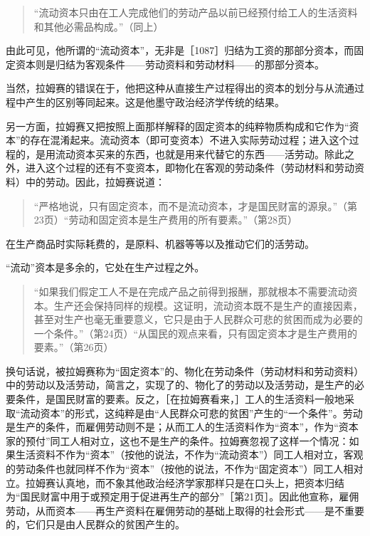 \begin{quote}{“流动资本只由在工人完成他们的劳动产品以前已经预付给工人的生活资料和其他必需品构成。”（同上）}\end{quote}

由此可见，他所谓的“流动资本”，无非是［1087］归结为工资的那部分资本，而固定资本则是归结为客观条件——劳动资料和劳动材料——的那部分资本。

当然，拉姆赛的错误在于，他把这种从直接生产过程得出的资本的划分与从流通过程中产生的区别等同起来。这是他墨守政治经济学传统的结果。

另一方面，拉姆赛又把按照上面那样解释的固定资本的纯粹物质构成和它作为“资本”的存在混淆起来。流动资本（即可变资本）不进入实际劳动过程；进入这个过程的，是用流动资本买来的东西，也就是用来代替它的东西——活劳动。除此之外，进入这个过程的还有不变资本，即物化在客观的劳动条件（劳动材料和劳动资料）中的劳动。因此，拉姆赛说道：

\begin{quote}{“严格地说，只有固定资本，而不是流动资本，才是国民财富的源泉。”（第23页）“劳动和固定资本是生产费用的所有要素。”（第28页）}\end{quote}

在生产商品时实际耗费的，是原料、机器等等以及推动它们的活劳动。

“流动”资本是多余的，它处在生产过程之外。

\begin{quote}{“如果我们假定工人不是在完成产品之前得到报酬，那就根本不需要流动资本。生产还会保持同样的规模。这证明，流动资本既不是生产的直接因素，甚至对生产也毫无重要意义，它只是由于人民群众可悲的贫困而成为必要的一个条件。”（第24页）“从国民的观点来看，只有固定资本才是生产费用的要素。”（第26页）}\end{quote}

换句话说，被拉姆赛称为“固定资本”的、物化在劳动条件（劳动材料和劳动资料）中的劳动以及活劳动，简言之，实现了的、物化了的劳动以及活劳动，是生产的必要条件，是国民财富的要素。反之，［在拉姆赛看来，］工人的生活资料一般地采取“流动资本”的形式，这纯粹是由“人民群众可悲的贫困”产生的“一个条件”。劳动是生产的条件，而雇佣劳动则不是；从而工人的生活资料作为“资本”，作为“资本家的预付”同工人相对立，这也不是生产的条件。拉姆赛忽视了这样一个情况：如果生活资料不作为“资本”（按他的说法，不作为“流动资本”）同工人相对立，客观的劳动条件也就同样不作为“资本”（按他的说法，不作为“固定资本”）同工人相对立。拉姆赛认真地，而不象其他政治经济学家那样只是在口头上，把资本归结为“国民财富中用于或预定用于促进再生产的部分”［第21页］。因此他宣称，雇佣劳动，从而资本——再生产资料在雇佣劳动的基础上取得的社会形式——是不重要的，它们只是由人民群众的贫困产生的。

